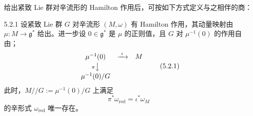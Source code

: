 给出紧致 Lie 群对辛流形的 Hamilton 作用后，可按如下方式定义与之相伴的商：

\begin{theorem*}{5.2.1}
  设紧致 Lie 群 $G$ 对辛流形 $(M,\omega)$ 有 Hamilton 作用，其动量映射由 $\mu\colon M\to\mathfrak{g}^*$ 给出。进一步设 $0\in\mathfrak{g}^*$ 是 $\mu$ 的正则值，且 $G$ 对 $\mu^{-1}(0)$ 的作用自由；
  \begin{equation}
    \begin{array}{ccc}
      \mu^{-1}(0) & \xrightarrow{\ \iota\ } & M\\[2pt]
      {\scriptstyle\pi}\big\downarrow & & \\[2pt]
      \mu^{-1}(0)/G & &
    \end{array}
    \tag{5.2.1}
  \end{equation}
  此时，$M/\!\!/G:=\mu^{-1}(0)/G$ 上满足
  \begin{equation}
    \pi^*\omega_{\mathrm{red}}=\iota^*\omega_M
    \tag{5.2.2}
  \end{equation}
  的辛形式 $\omega_{\mathrm{red}}$ 唯一存在。
\end{theorem*}

